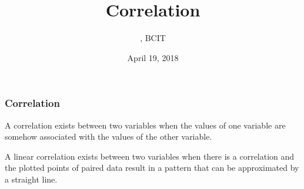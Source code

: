 \documentclass[xcolor=dvipsnames]{beamer}
\title{Correlation}
\subtitle{{\CourseNumber}, BCIT}
\author{\CourseName}
\date{April 19, 2018}
\begin{document}
\begin{frame}
  \titlepage
\end{frame}


\begin{frame}
  \frametitle{Correlation}
  A \alert{correlation} exists between two variables when the values of
  one variable are somehow associated with the values of the other
  variable.

  \bigskip

    A \alert{linear correlation} exists between two variables when
    there is a correlation and the plotted points of paired data
    result in a pattern that can be approximated by a straight line.
\end{frame}
\end{document}
